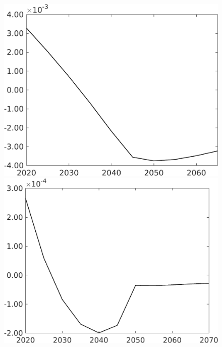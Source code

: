 \begin{figure}[h!!!]
\begin{minipage}[]{0.32\textwidth}
	\end{minipage}
	\begin{minipage}[]{0.32\textwidth}
		\includegraphics[width=1\textwidth]{../../codding_model/own_basedOnFried/optimalPol_010922_revision/figures/all_13Sept22_Tplus30/gAn_OPT_COMPtaulPer_regime4_spillover0_knspil0_noskill0_sep0_xgrowth0_PV1_etaa0.79.png}
	\end{minipage}
\begin{minipage}[]{0.32\textwidth}
\includegraphics[width=1\textwidth]{../../codding_model/own_basedOnFried/optimalPol_010922_revision/figures/all_13Sept22_Tplus30/SWF_OPT_COMPtaulPer_regime4_spillover0_knspil0_noskill0_sep0_xgrowth0_PV1_etaa0.79.png}
\end{minipage}
\end{figure} 


